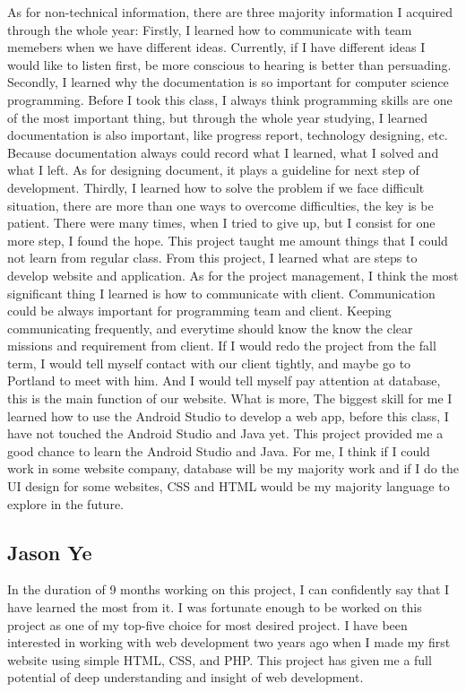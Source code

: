 \documentclass[onecolumn, draftclsnofoot,10pt, compsoc]{IEEEtran}
\begin{document}
\noindent As for non-technical information, there are three majority information I acquired through the whole year: Firstly, I learned how to communicate with team memebers when we have different ideas. Currently, if I have different ideas I would like to listen first, be more conscious to hearing is better than persuading. 
Secondly, I learned why the documentation is so important for computer science programming. Before I took this class, I always think programming skills are one of the most important thing, but through the whole year studying, I learned documentation is also important, like progress report, technology designing, etc. Because documentation always could record what I learned, what I solved and what I left. As for designing document, it plays a guideline for next step of development. Thirdly, I learned how to solve the problem if we face difficult situation, there are more than one ways to overcome difficulties, the key is be patient. There were many times, when I tried to give up, but I consist for one more step, I found the hope. This project taught me amount things that I could not learn from regular class. From this project, I learned what are steps to develop website and application. As for the project management, I think the most significant thing I learned is how to communicate with client. Communication could be always important for programming team and client. Keeping communicating frequently, and everytime should know the know the clear missions and requirement from client. If I would redo the project from the fall term, I would tell myself contact with our client tightly, and maybe go to Portland to meet with him. And I would tell myself pay attention at database, this is the main function of our website. What is more, The biggest skill for me I learned how to use the Android Studio to develop a web app, before this class, I have not touched the Android Studio and Java yet. This project provided me a good chance to learn the Android Studio and Java. For me, I think if I could work in some website company, database will be my majority work and if I do the UI design for some websites, CSS and HTML would be my majority language to explore in the future.\\


\subsection{Jason Ye}
\noindent In the duration of 9 months working on this project, I can confidently say that I have learned the most from it. I was fortunate enough to be worked on this project as one of my top-five choice for most desired project. I have been interested in working with web development two years ago when I made my first website using simple HTML, CSS, and PHP. This project has given me a full potential of deep understanding and insight of web development. \\
\end{document}
